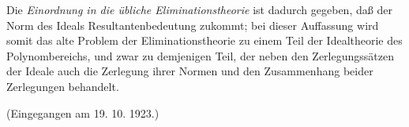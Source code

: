 Die \emph{Einordnung in die übliche Eliminationstheorie} ist dadurch gegeben, daß der Norm des Ideals Resultantenbedeutung zukommt; bei dieser Auffassung wird somit das alte Problem der Eliminationstheorie zu einem Teil der Idealtheorie des Polynombereichs, und zwar zu demjenigen Teil, der neben den Zerlegungssätzen der Ideale auch die Zerlegung ihrer Normen und den Zusammenhang beider Zerlegungen behandelt.

\begin{center}
(Eingegangen am 19. 10. 1923.)
\end{center}

\clearpage
